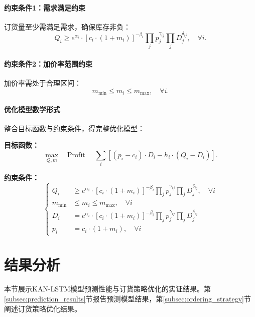 \documentclass[lang=cn,12pt,a4paper]{elegantpaper}
\begin{document}
\paragraph{约束条件1：需求满足约束}
订货量至少需满足需求，确保库存非负：
\begin{equation}
Q_i \geq e^{\alpha_i} \cdot \left[ c_i \cdot (1 + m_i) \right]^{-\beta_i} \prod_j p_j^{\gamma_{ij}} \prod_j D_j^{\delta_{ij}}, \quad \forall i.
\end{equation}

\paragraph{约束条件2：加价率范围约束}
加价率需处于合理区间：
\begin{equation}
m_{\text{min}} \leq m_i \leq m_{\text{max}}, \quad \forall i.
\end{equation}

\paragraph{优化模型数学形式}
整合目标函数与约束条件，得完整优化模型：

\textbf{目标函数：}
\begin{equation}
\max_{Q, m} \quad \text{Profit} = \sum_i \left[ (p_i - c_i) \cdot D_i - h_i \cdot (Q_i - D_i) \right].
\end{equation}

\textbf{约束条件：}
\begin{equation}
\begin{cases}
Q_i &\geq e^{\alpha_i} \cdot \left[ c_i \cdot (1 + m_i) \right]^{-\beta_i} \prod_j p_j^{\gamma_{ij}} \prod_j D_j^{\delta_{ij}}, \quad \forall i \\
m_{\min} &\leq m_i \leq m_{\max}, \quad \forall i \\
D_i &= e^{\alpha_i} \cdot \left[ c_i \cdot (1 + m_i) \right]^{-\beta_i} \prod_j p_j^{\gamma_{ij}} \prod_j D_j^{\delta_{ij}} \\
p_i &= c_i \cdot (1 + m_i), \quad \forall i
\end{cases}
\end{equation}
\section{结果分析}
\label{sec:results}
本节展示KAN-LSTM模型预测性能与订货策略优化的实证结果。第\ref{subsec:prediction_results}节报告预测模型结果，第\ref{subsec:ordering_strategy}节阐述订货策略优化结果。
\end{document}
